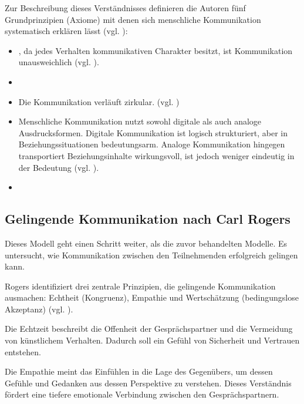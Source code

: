 Zur Beschreibung dieses Verständnisses definieren die Autoren fünf Grundprinzipien (Axiome) mit denen sich menschliche Kommunikation systematisch erklären lässt (vgl. \citealp{Watzlawick2016-km}):
\begin{itemize}
    \item {}, da jedes Verhalten kommunikativen Charakter besitzt, ist Kommunikation unausweichlich (vgl. \citealp[S. 53]{Watzlawick2016-km}).
    \item {} \cite[S. 64]{Watzlawick2016-km}
    \item {} Die Kommunikation verläuft zirkular. (vgl. \citealp[S. 69]{Watzlawick2016-km})
    \item Menschliche Kommunikation nutzt sowohl digitale als auch analoge Ausdrucksformen. Digitale Kommunikation ist logisch strukturiert, aber in Beziehungssituationen bedeutungsarm. Analoge Kommunikation hingegen transportiert Beziehungsinhalte wirkungsvoll, ist jedoch weniger eindeutig in der Bedeutung (vgl. \citealp[S. 77]{Watzlawick2016-km}).
    \item {} \cite[S. 80]{Watzlawick2016-km}
\end{itemize}

\subsection{Gelingende Kommunikation nach Carl Rogers}
Dieses Modell geht einen Schritt weiter, als die zuvor behandelten Modelle. Es untersucht, wie Kommunikation zwischen den Teilnehmenden erfolgreich gelingen kann.

Rogers identifiziert drei zentrale Prinzipien, die gelingende Kommunikation ausmachen: Echtheit (Kongruenz), Empathie und Wertschätzung (bedingungslose Akzeptanz) (vgl. \citealp{jesse_carl_2025}).

Die Echtzeit beschreibt die Offenheit der Gesprächspartner und die Vermeidung von künstlichem Verhalten. Dadurch soll ein Gefühl von Sicherheit und Vertrauen entstehen. 

Die Empathie meint das Einfühlen in die Lage des Gegenübers, um dessen Gefühle und Gedanken aus dessen Perspektive zu verstehen. Dieses Verständnis fördert eine tiefere emotionale Verbindung zwischen den Gesprächspartnern.

